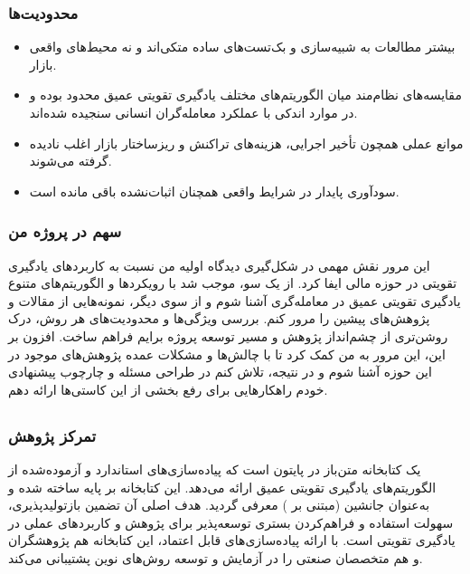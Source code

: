 \documentclass[12pt, a4paper]{report}
\begin{document}
\subsubsection{محدودیت‌ها}
\begin{itemize}
    \item بیشتر مطالعات به شبیه‌سازی و بک‌تست‌های ساده متکی‌اند و نه محیط‌های واقعی بازار.  
    \item مقایسه‌های نظام‌مند میان الگوریتم‌های مختلف یادگیری تقویتی عمیق محدود بوده و در موارد اندکی با عملکرد معامله‌گران انسانی سنجیده شده‌اند.  
    \item موانع عملی همچون تأخیر اجرایی، هزینه‌های تراکنش و ریزساختار بازار اغلب نادیده گرفته می‌شوند.  
    \item سودآوری پایدار در شرایط واقعی همچنان اثبات‌نشده باقی مانده است.  
\end{itemize}

\subsubsection{سهم در پروژه من}
این مرور نقش مهمی در شکل‌گیری دیدگاه اولیه من نسبت به کاربردهای یادگیری تقویتی در حوزه مالی ایفا کرد. از یک سو، موجب شد با رویکردها و الگوریتم‌های متنوع یادگیری تقویتی عمیق در معامله‌گری آشنا شوم و از سوی دیگر، نمونه‌هایی از مقالات و پژوهش‌های پیشین را مرور کنم. بررسی ویژگی‌ها و محدودیت‌های هر روش، درک روشن‌تری از چشم‌انداز پژوهش و مسیر توسعه پروژه برایم فراهم ساخت.  
افزون بر این، این مرور به من کمک کرد تا با چالش‌ها و مشکلات عمده پژوهش‌های موجود در این حوزه آشنا شوم و در نتیجه، تلاش کنم در طراحی مسئله و چارچوب پیشنهادی خودم راهکارهایی برای رفع بخشی از این کاستی‌ها ارائه دهم.


\subsection{ \cite{raffin2021stable}}

\subsubsection{تمرکز پژوهش}
 یک کتابخانه متن‌باز در پایتون است که پیاده‌سازی‌های استاندارد و آزموده‌شده از الگوریتم‌های یادگیری تقویتی عمیق ارائه می‌دهد. این کتابخانه بر پایه  ساخته شده و به‌عنوان جانشین  (مبتنی بر ) معرفی گردید. هدف اصلی آن تضمین بازتولیدپذیری، سهولت استفاده و فراهم‌کردن بستری توسعه‌پذیر برای پژوهش و کاربردهای عملی در یادگیری تقویتی است. با ارائه پیاده‌سازی‌های قابل اعتماد، این کتابخانه هم پژوهشگران و هم متخصصان صنعتی را در آزمایش و توسعه روش‌های نوین پشتیبانی می‌کند.
\end{document}
